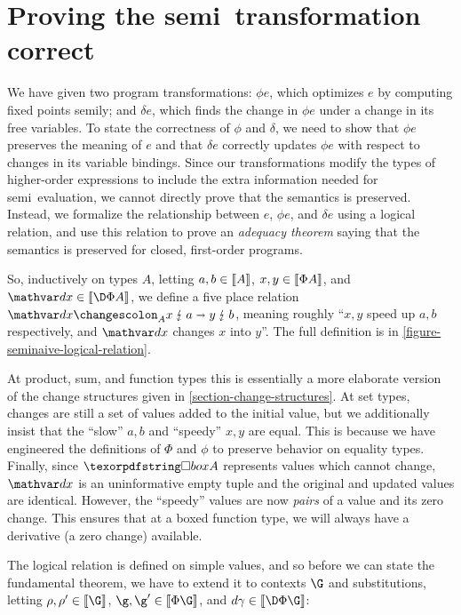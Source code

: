 \section{Proving the semi\naive\ transformation correct}


\label{section-logical-relation}

We have given two program transformations: $\phi e$, which optimizes $e$ by
computing fixed points semi\naive{}ly; and $\delta e$, which finds the change in
$\phi e$ under a change in its free variables.
%
To state the correctness of $\phi$ and $\delta$, we need to show that $\phi e$
preserves the meaning of $e$ and that $\delta e$ correctly updates $\phi e$ with
respect to changes in its variable bindings.
%
Since our transformations modify the types of higher-order expressions to
include the extra information needed for semi\naive\ evaluation, we cannot
directly prove that the semantics is preserved.
%
Instead, we formalize the relationship between $e$, $\phi e$, and $\delta e$
using a logical relation, and use this relation to prove an \emph{adequacy
  theorem} saying that the semantics is preserved for closed, first-order
programs.



So, inductively on types $A$, letting $a,b \in \llbracket{A}\rrbracket$, $x,y \in \llbracket{\Phi A}\rrbracket$,
and $\dx \in \den{\DP A}$, we define a five place relation
$\weirdat{A}{\dx}{x}{a}{y}{b}$, meaning roughly ``$x,y$ speed up $a,b$
respectively, and $\dx$ changes $x$ into $y$''. The full definition is in
\cref{figure-seminaive-logical-relation}.

At product, sum, and function types this is essentially a more elaborate version
of the change structures given in \cref{section-change-structures}.
%
At set types, changes are still a set of values added to the initial value, but
we additionally insist that the ``slow'' $a,b$ and ``speedy'' $x,y$ are equal.
%
This is because we have engineered the definitions of $\Phi$ and $\phi$ to
preserve behavior on equality types.
%
Finally, since $\iso A$ represents values which cannot change, $\dx$ is an
uninformative empty tuple and the original and updated values are identical.
%
However, the ``speedy'' values are now \emph{pairs} of a value and its zero
change.
%
This ensures that at a boxed function type, we will always have a derivative (a
zero change) available.

The logical relation is defined on simple values, and so before we can state the
fundamental theorem, we have to extend it to contexts $\G$ and substitutions,
letting $\rho,\rho' \in \den{\G}$, $\g,\g' \in \den{\Phi\G}$, and $\dgamma \in
\den{\DP\G}$:

